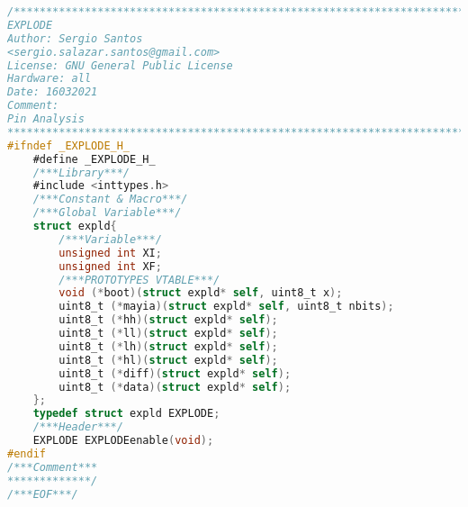 \begin{lstlisting}[language=C, caption={explode.h}, label=explode-h, captionpos=b]
/************************************************************************
EXPLODE
Author: Sergio Santos
<sergio.salazar.santos@gmail.com>
License: GNU General Public License
Hardware: all
Date: 16032021
Comment:
Pin Analysis
************************************************************************/
#ifndef _EXPLODE_H_
	#define _EXPLODE_H_
	/***Library***/
	#include <inttypes.h>
	/***Constant & Macro***/
	/***Global Variable***/
	struct expld{
		/***Variable***/
		unsigned int XI;
		unsigned int XF;
		/***PROTOTYPES VTABLE***/
		void (*boot)(struct expld* self, uint8_t x);
		uint8_t (*mayia)(struct expld* self, uint8_t nbits);
		uint8_t (*hh)(struct expld* self);
		uint8_t (*ll)(struct expld* self);
		uint8_t (*lh)(struct expld* self);
		uint8_t (*hl)(struct expld* self);
		uint8_t (*diff)(struct expld* self);
		uint8_t (*data)(struct expld* self);
	};
	typedef struct expld EXPLODE;
	/***Header***/
	EXPLODE EXPLODEenable(void);
#endif
/***Comment***
*************/
/***EOF***/
\end{lstlisting}
